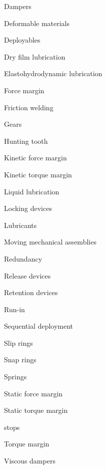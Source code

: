 \documentclass[12pt]{article}
\begin{document}
Dampers

Deformable materials

Deployables

Dry film lubrication

Elastohydrodynamic lubrication

Force margin

Friction welding

Gears

Hunting tooth

Kinetic force margin

Kinetic torque margin

Liquid lubrication

Locking devices

Lubricants

Moving mechanical assemblies

Redundancy

Release devices

Retention devices

Run-in

Sequential deployment

Slip rings

Snap rings

Springs

Static force margin

Static torque margin

stops

Torque margin

Viscous dampers

\end{document}
